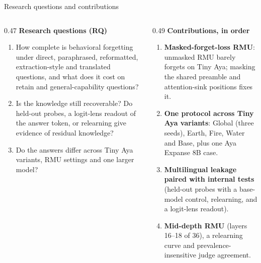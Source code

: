 \documentclass[aspectratio=169,11pt,usepdftitle=false]{beamer}
\begin{document}
\begin{frame}{Research questions and contributions}
\small
\begin{columns}[T]
\begin{column}{0.47\textwidth}
\footnotesize
\textbf{Research questions (RQ)}
\begin{enumerate}
\item[\textbf{RQ1}] How complete is behavioral forgetting under direct, paraphrased, reformatted, extraction-style and translated questions, and what does it cost on retain and general-capability questions?
\item[\textbf{RQ2}] Is the knowledge still recoverable? Do held-out probes, a logit-lens readout of the answer token, or relearning give evidence of residual knowledge?
\item[\textbf{RQ3}] Do the answers differ across Tiny Aya variants, RMU settings and one larger model?
\end{enumerate}
\end{column}
\begin{column}{0.49\textwidth}
\footnotesize
\textbf{Contributions, in order}
\begin{enumerate}
\item \textbf{Masked-forget-loss RMU}: unmasked RMU barely forgets on Tiny Aya; masking the shared preamble and attention-sink positions fixes it.
\item \textbf{One protocol across Tiny Aya variants}: Global (three seeds), Earth, Fire, Water and Base, plus one Aya Expanse 8B case.
\item \textbf{Multilingual leakage paired with internal tests} (held-out probes with a base-model control, relearning, and a logit-lens readout).
\item \textbf{Mid-depth RMU} (layers 16--18 of 36), a relearning curve and prevalence-insensitive judge agreement.
\end{enumerate}
\end{column}
\end{columns}
\end{frame}
\end{document}
